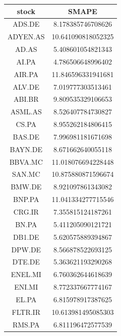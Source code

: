 \documentclass[11pt]{article} %
\begin{document}
\begin{tabular}{| c | c | }
\hline
stock    & SMAPE\\
\hline
ADS.DE   & 8.178385746708626\\
ADYEN.AS & 10.641090818052325\\
AD.AS    & 5.408601054821343\\
AI.PA    & 4.786506648996402\\
AIR.PA   & 11.846596331941681\\
ALV.DE   & 7.019777303513461\\
ABI.BR   & 9.809535329106653\\
ASML.AS  & 8.526407784730827\\
CS.PA    & 8.955262184806415\\
BAS.DE   & 7.996981181671698\\
BAYN.DE  & 8.671662640055118\\
BBVA.MC  & 11.018076694228448\\
SAN.MC   & 10.875880871596674\\
BMW.DE   & 8.921097861343082\\
BNP.PA   & 11.041334277715546\\
CRG.IR   & 7.355815124187261\\
BN.PA    & 5.411205090121721\\
DB1.DE   & 5.620575889394867\\
DPW.DE   & 8.566878522693125\\
DTE.DE   & 5.363621193290268\\
ENEL.MI  & 6.760362644618639\\
ENI.MI   & 8.772337667774167\\
EL.PA    & 6.815978917387625\\
FLTR.IR  & 10.613981495085303\\
RMS.PA   & 6.811196472577539\\
\end{tabular}
\end{document}
